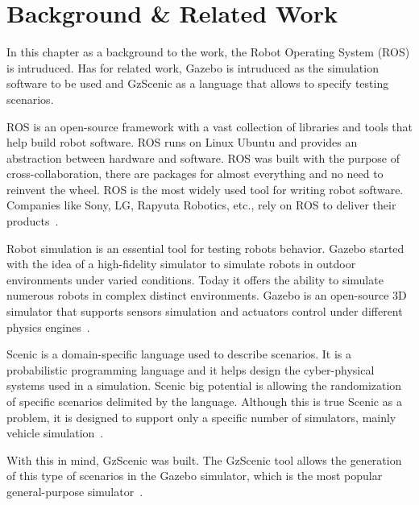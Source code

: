 \chapter{Background \& Related Work}
\label{chap:background}

In this chapter as a background to the work, 
the Robot Operating System (ROS) is intruduced.
Has for related work, Gazebo is intruduced as the simulation software to be used 
and GzScenic as a language that allows to specify testing scenarios.

\par

ROS is an open-source framework with a vast collection 
of libraries and tools that help build robot software. 
ROS runs on Linux Ubuntu and provides an abstraction between hardware and software.
ROS was built with the purpose of cross-collaboration, there are
packages for almost everything and no need to reinvent the wheel.
ROS is the most widely used tool for writing robot software.
Companies like Sony, LG, Rapyuta Robotics, etc., rely on ROS to deliver their products~\cite{Ros}.

\par

Robot simulation is an essential tool for testing robots behavior. 
Gazebo started with the idea of a high-fidelity simulator to simulate 
robots in outdoor environments under varied conditions.
Today it offers the ability to simulate numerous robots in complex distinct environments.
Gazebo is an open-source 3D simulator that supports sensors simulation 
and actuators control under different physics engines~\cite{Gazebo}.

\par

Scenic is a domain-specific language used to describe scenarios.
It is a probabilistic programming language and it helps design the 
cyber-physical systems used in a simulation.
Scenic big potential is allowing the randomization of specific scenarios delimited by the language.
Although this is true Scenic as a problem, it is designed to support only 
a specific number of simulators, mainly vehicle simulation~\cite{Scenic}.

\par

With this in mind, GzScenic was built. The GzScenic tool allows the generation of this type of 
scenarios in the Gazebo simulator, which is the most popular general-purpose simulator~\cite{GzScenic}.